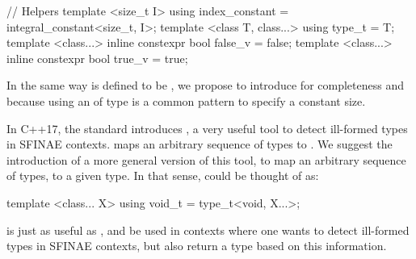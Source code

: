 \documentclass[ebook,10pt,oneside,openany,final]{memoir}
\begin{document}
\begin{codeblock}
// Helpers
template <size_t I> using index_constant = integral_constant<size_t, I>;
template <class T, class...> using type_t = T;
template <class...> inline constexpr bool false_v = false;
template <class...> inline constexpr bool true_v = true;
\end{codeblock}

In the same way  is defined to be , we propose to introduce  for completeness and because using an  of type  is a common pattern to specify a constant size.

In C++17, the standard introduces , a very useful tool to detect ill-formed types in SFINAE contexts.  maps an arbitrary sequence of types to . We suggest the introduction of a more general version of this tool, to map an arbitrary sequence of types, to a given type. In that sense,  could be thought of as:
\begin{codeblock}
template <class... X> using void_t = type_t<void, X...>;
\end{codeblock}
 is just as useful as , and be used in contexts where one wants to detect ill-formed types in SFINAE contexts, but also return a type based on this information.
\end{document}
